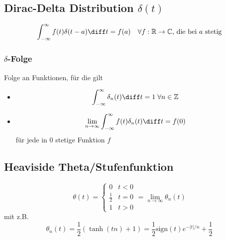 \subsection{Dirac-Delta Distribution $\delta(t)$}
\begin{emphbox}
    \begin{equation*}
        \int_{-\infty}^\infty f(t)\delta(t - a)\diff t = f(a) \quad \forall f:\mathbb R \rightarrow \mathbb C \text{, die bei } a \text{ stetig}
    \end{equation*}
\end{emphbox}

\begin{sectionbox}
    \subsubsection{$\delta$-Folge}
    Folge an Funktionen, für die gilt
    \begin{itemize}
        \item[] \begin{equation*}
                  \int_{-\infty}^{\infty}\delta_n(t)\diff t = 1 \; \forall n \in \mathbb Z
              \end{equation*}
        \item[] \begin{equation*}
                  \lim_{n\rightarrow\infty}\int_{-\infty}^{\infty}f(t)\delta_n(t)\diff t = f(0)
              \end{equation*} für jede in $0$ stetige Funktion $f$
    \end{itemize}
\end{sectionbox}

\subsection{Heaviside Theta/Stufenfunktion}
\begin{sectionbox}
    \begin{equation*}
        \theta(t) = \begin{cases}
            0           & t < 0 \\
            \frac{1}{2} & t = 0 \\
            1           & t > 0
        \end{cases} = \lim_{n\rightarrow\infty}\theta_n(t)
    \end{equation*}
    mit z.B. \begin{equation*}
        \theta_n(t)=\frac{1}{2}(\tanh(tn) + 1) = \frac{1}{2}\text{sign}(t)e^{-|t|/n} + \frac{1}{2}
    \end{equation*}
\end{sectionbox}

